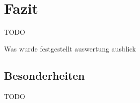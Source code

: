 \chapter{Fazit}%

\label{cha:Fazit}
\colorbox{red!30}{TODO}

Was wurde festgestellt
auswertung ausblick

\section{Besonderheiten}

\colorbox{red!30}{TODO}